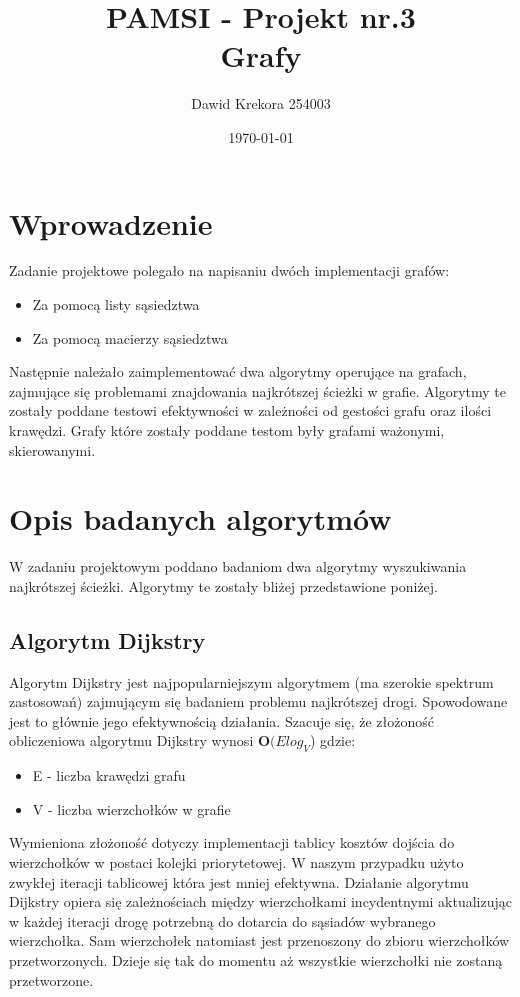 \documentclass[10pt,a4paper]{article} %
\begin{document}
\title{PAMSI - Projekt nr.3 \\
	   \large Grafy}
\author{Dawid Krekora 254003}
\date{\today}
\maketitle
\tableofcontents
	\newpage
	\section{Wprowadzenie}
	Zadanie projektowe polegało na napisaniu dwóch implementacji grafów:
	\begin{itemize}
		\item Za pomocą listy sąsiedztwa
		\item Za pomocą macierzy sąsiedztwa
	\end{itemize} 
	Następnie należało zaimplementować dwa algorytmy operujące na grafach, zajmujące się problemami znajdowania najkrótszej ścieżki w grafie. Algorytmy te zostały poddane testowi efektywności w zależności od gestości grafu oraz ilości krawędzi. Grafy które zostały poddane testom były grafami ważonymi, skierowanymi.
	\section{Opis badanych algorytmów}
	W zadaniu projektowym poddano badaniom dwa algorytmy wyszukiwania najkrótszej ścieżki. Algorytmy te zostały bliżej przedstawione poniżej.
	\subsection{Algorytm Dijkstry}
	Algorytm Dijkstry jest najpopularniejszym algorytmem (ma szerokie spektrum zastosowań) zajmującym się badaniem problemu najkrótszej drogi. Spowodowane jest to głównie jego efektywnością działania. Szacuje się, że złożoność obliczeniowa algorytmu Dijkstry wynosi $\textbf{O}(Elog_{V}$) gdzie:
	\begin{itemize}
		\item E - liczba krawędzi grafu
		\item V - liczba wierzchołków w grafie
	\end{itemize}
	Wymieniona złożoność dotyczy implementacji tablicy kosztów dojścia do wierzchołków w postaci kolejki priorytetowej. W naszym przypadku użyto zwykłej iteracji tablicowej która jest mniej efektywna. Działanie algorytmu Dijkstry opiera się zależnościach między  wierzchołkami incydentnymi aktualizując w każdej iteracji drogę potrzebną do dotarcia do sąsiadów wybranego wierzchołka. Sam wierzchołek natomiast jest przenoszony do zbioru wierzchołków przetworzonych. Dzieje się tak do momentu aż wszystkie wierzchołki nie zostaną przetworzone.
\end{document}
